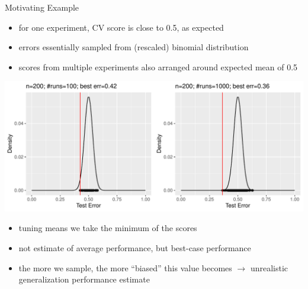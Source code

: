 \begin{frame}[c,allowframebreaks]{Motivating Example}
    \begin{itemize}
    \item for one experiment, CV score is close to 0.5, as expected
    \item errors essentially sampled from (rescaled) binomial distribution
    \item scores from multiple experiments also arranged around expected mean of 0.5
    \end{itemize}

    \framebreak

    \begin{center}
        \includegraphics[height=.55\textheight]{images/dist-tuning2}
    \end{center}

    \begin{itemize}
    \item tuning means we take the minimum of the scores
    \item not estimate of average performance, but best-case performance
    \item the more we sample, the more ``biased'' this value becomes
        $\rightarrow$ unrealistic generalization performance estimate
    \end{itemize}
    \end{frame}

